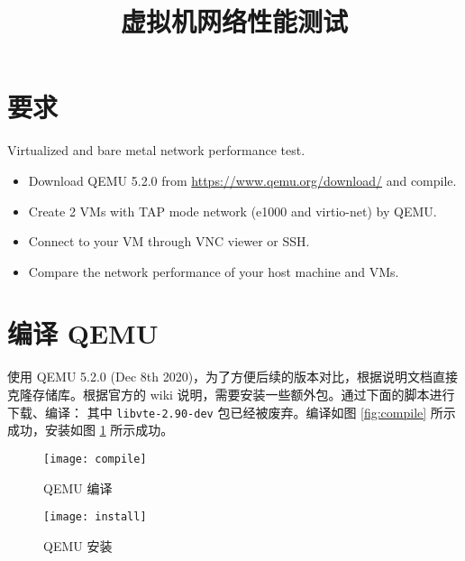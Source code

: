 

    \title{虚拟机网络性能测试}
    \maketitle
    \section*{要求}
    Virtualized and bare metal network performance test.
    \begin{itemize}
        \item Download QEMU 5.2.0 from \href{https://www.qemu.org/download/}{https://www.qemu.org/download/} and compile.
        \item Create 2 VMs with TAP mode network (e1000 and virtio-net) by QEMU.
        \item Connect to your VM through VNC viewer or SSH.
        \item Compare the network performance of your host machine and VMs.
    \end{itemize}
    \section{编译 QEMU}
    使用 QEMU 5.2.0 (Dec 8th 2020)，为了方便后续的版本对比，根据说明文档\cite{readme}直接克隆存储库。根据官方的 wiki 说明\cite{installwiki}，需要安装一些额外包。通过下面的脚本进行下载、编译：
    其中 \verb"libvte-2.90-dev" 包已经被废弃。编译如图 \ref{fig:compile} 所示成功，安装如图 \ref{fig:install} 所示成功。
    \begin{figure}[h]
        \centering
        \begin{minipage}{0.48\textwidth}
            \texttt{[image: compile]}
            \caption{QEMU 编译}\label{fig:compile}
        \end{minipage}
        \begin{minipage}{0.48\textwidth}
            \texttt{[image: install]}
            \caption{QEMU 安装}\label{fig:install}
        \end{minipage}
    \end{figure}


    
